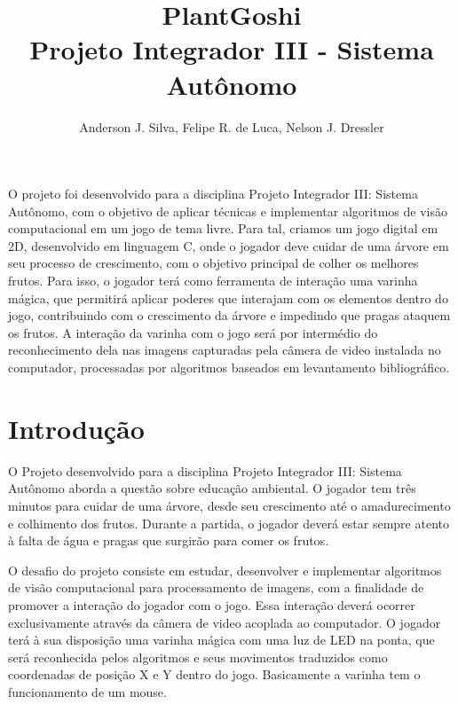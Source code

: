 \documentclass[12pt]{article}
\title{PlantGoshi\\ Projeto Integrador III - Sistema Aut\^onomo}
\author{Anderson J. Silva, Felipe R. de Luca, Nelson J. Dressler }
\begin{document}
 

\maketitle
     
\begin{resumo} 
O projeto foi desenvolvido para a disciplina Projeto Integrador III: Sistema Aut\^onomo,
com o objetivo de aplicar t\'ecnicas e implementar algoritmos de vis\~ao computacional
em um jogo de tema livre. Para tal, criamos um jogo digital em 2D, desenvolvido em linguagem C,
onde o jogador deve cuidar de uma \'arvore em seu processo de crescimento, com o objetivo
principal de colher os melhores frutos. Para isso, o jogador ter\'a como ferramenta de
intera\c c\~ao uma varinha m\'agica, que permitir\'a aplicar poderes que interajam
com os elementos dentro do jogo, contribuindo com o crescimento da \'arvore e impedindo
que pragas ataquem os frutos. A intera\c c\~ao da varinha com o jogo ser\'a por
interm\'edio do reconhecimento dela nas imagens capturadas pela c\^amera de video
instalada no computador, processadas por algoritmos baseados em levantamento bibliogr\'afico.

\end{resumo}

\section{Introdu\c c\~ao}

 O Projeto desenvolvido para a disciplina Projeto Integrador III: Sistema Aut\^onomo aborda a quest\~ao sobre
 educa\c c\~ao ambiental. O jogador tem tr\^es minutos para cuidar de uma \'arvore, desde seu crescimento
 at\'e o amadurecimento e colhimento dos frutos. Durante a partida, o jogador dever\'a estar sempre atento
 \`a falta de \'agua e pragas que surgir\~ao para comer os frutos.
   
 O desafio do projeto consiste em estudar, desenvolver e implementar algoritmos de vis\~ao computacional 
 para processamento de imagens, com a finalidade de promover a intera\c c\~ao do jogador com o jogo. Essa
 intera\c c\~ao dever\'a ocorrer exclusivamente atrav\'es da c\^amera de video acoplada ao computador. O jogador
 ter\'a \`a sua disposi\c c\~ao uma varinha m\'agica com uma luz de LED na ponta, que ser\'a reconhecida pelos algoritmos
 e seus movimentos traduzidos como coordenadas de posi\c c\~ao X e Y dentro do jogo. Basicamente a varinha tem
 o funcionamento de um mouse.   
  
\end{document}
